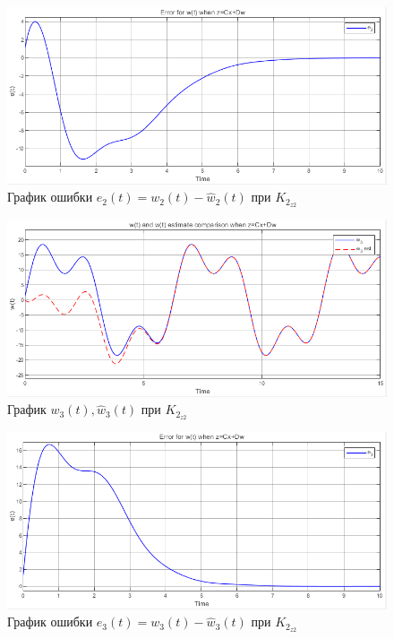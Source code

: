 \documentclass[a4paper, 12pt]{article}
\begin{document}
    \begin{figure}[H]
        \centering
        \includegraphics[scale=0.75]{3task_we2cd.png}
        \captionsetup{skip=0pt}
        \caption{График ошибки $e_2(t)=w_2(t)-\hat{w}_2(t)$ при $K_{2_{z2}}$}
        \label{fig:3task_we2cd}
    \end{figure}
    \begin{figure}[H]
        \centering
        \includegraphics[scale=0.75]{3task_wwh3cd.png}
        \captionsetup{skip=0pt}
        \caption{График $w_3(t),\hat{w}_3(t)$ при $K_{2_{z2}}$}
        \label{fig:3task_wwh3cd}
    \end{figure}
    \begin{figure}[H]
        \centering
        \includegraphics[scale=0.75]{3task_we3cd.png}
        \captionsetup{skip=0pt}
        \caption{График ошибки $e_3(t)=w_3(t)-\hat{w}_3(t)$ при $K_{2_{z2}}$}
        \label{fig:3task_we3cd}
    \end{figure}
\end{document}

